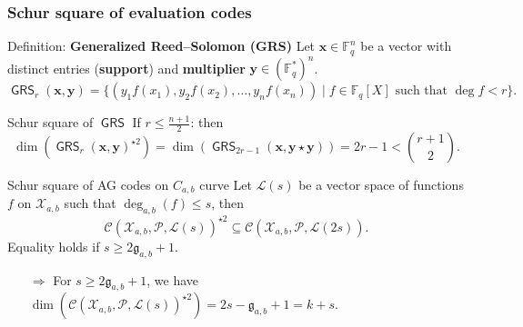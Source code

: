 \documentclass[
10pt, %
%
aspectratio=169, %
]{beamer}
\theoremstyle{plain}%
\theoremstyle{definition}
\theoremstyle{remark}
\newcommand{\calP}{\mathcal{P}}
\newcommand{\calL}{\mathcal{L}}
\newcommand{\calC}{\mathcal{C}}
\newcommand{\calX}{\mathcal{X}}
\newcommand{\fq}{\mathbb{F}_{q}}
\newcommand{\GRS}{\operatorname{\mathsf{GRS}}}
\newcommand{\degab}[1]{\deg_{a,b}\left(#1\right)}
\begin{document}
	\begin{frame}
		\frametitle{Schur square of evaluation codes}
		\begin{block}{Definition: \textbf{Generalized Reed--Solomon (GRS)}}
			Let $\mathbf{x}\in \fq^n$ be a vector with distinct entries (\textbf{support}) and \textbf{multiplier} $\mathbf{y} \in (\fq^*)^n$.
			\vspace{-0.7em}
			\[\GRS_r(\mathbf{x},\mathbf{y})=\{(y_1f(x_1),y_2f(x_2),\dots,y_nf(x_n)) \mid f \in \fq[X] \text{ such that } \deg f < r \}.\]
		\end{block}
		\begin{block}{Schur square of $\GRS$}
			If $r \leq \frac{n+1}{2}$: then
			\vspace{-0.7em}
			$$\dim(\GRS_r(\mathbf{x},\mathbf{y})^{\star 2})=\dim(\GRS_{2r-1}(\mathbf{x},\mathbf{y\star y}))= 2r-1 < \binom{r+1}{2}.$$
		\end{block}
	\pause
		\begin{alertblock}{Schur square of AG codes on $C_{a,b}$ curve}
			Let $\calL(s)$ be a vector space of functions $f$ on $\calX_{a,b}$ such that $\degab{f}\leq s$, then
			\vspace{-0.5em}
			\[\calC(\calX_{a,b},\calP,\calL(s))^{\star 2 }\subseteq \calC(\calX_{a,b},\calP,\calL(2s)).\]
			Equality holds if $ s \geq 2\mathfrak{g}_{a,b}+1$.
		\end{alertblock}
	\vspace{-0.5em}
		\begin{itemize}
			\item [$\Longrightarrow$] For $ s \geq 2\mathfrak{g}_{a,b}+1$, we have $\dim(\calC(\calX_{a,b},\calP,\calL(s))^{\star 2 })=2s - \mathfrak{g}_{a,b} + 1 = k+s$.
			
		\end{itemize}
	\end{frame}
\end{document}
